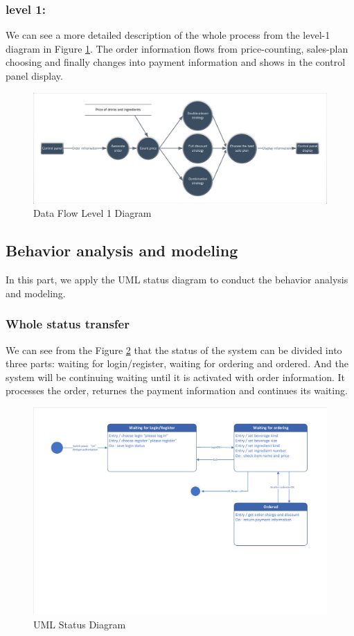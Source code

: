 \documentclass[a4paper]{report}
\begin{document}
\subsubsection{level 1:}
We can see a more detailed description of the whole process from the level-1 diagram in Figure \ref{6}. The order information flows from price-counting, sales-plan choosing and finally changes into payment information and shows in the control panel display.
\begin{figure}
  \centering
  \includegraphics[scale=0.38]{DataFlowLevel1.pdf}
  \caption{Data Flow Level 1 Diagram}\label{6}
\end{figure}

\subsection{Behavior analysis and modeling}
In this part, we apply the UML status diagram to conduct the behavior analysis and modeling.
\subsubsection{Whole status transfer}
We can see from the Figure \ref{7} that the status of the system can be divided into three parts: waiting for login/register, waiting for ordering and ordered. And the system will be continuing waiting until it is activated with order information. It processes the order, returnes the payment information and continues its waiting.
\begin{figure}
  \centering
  \includegraphics[scale=0.38]{statusDiagram.pdf}
  \caption{UML Status Diagram}\label{7}
\end{figure}
\end{document}
